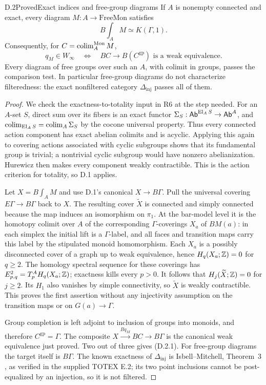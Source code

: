 \begin{claim}{D.2}{Proved}{Exact indices and free-group diagrams}
\label{D:exact}
If $A$ is nonempty connected and exact, every diagram
$M:A\to\mathrm{FreeMon}$ satisfies
\[
 B\int_A M\simeq K(\Gamma,1).
\]
Consequently, for $C=\operatorname*{colim}_A^{\mathrm{Mon}}M$,
\[
 q_M\in W_\infty
 \quad\Longleftrightarrow\quad
 BC\longrightarrow B(C^{\mathrm{gp}})\text{ is a weak equivalence}.
 \tag{D.2.1}
\]
Every diagram of free groups over such an $A$, with colimit in
groups, passes the comparison test. In particular free-group
diagrams do not characterize filteredness: the exact nonfiltered
category $\Delta_{\mathrm{inj}}$ passes all of them.
\end{claim}
\begin{proof}
We check the exactness-to-totality input in R6 at the step needed.
For an $A$-set $S$, direct sum over its fibers is an exact functor
$\Sigma_S:\mathsf{Ab}^{\operatorname{El}_A S}\to\mathsf{Ab}^A$, and
$\operatorname*{colim}_{\operatorname{El}_A S}=\operatorname*{colim}_A\Sigma_S$ by the cocone universal
property. Thus every connected action component has exact abelian
colimits and is acyclic. Applying this again to covering actions
associated with cyclic subgroups shows that its fundamental group
is trivial; a nontrivial cyclic subgroup would have nonzero
abelianization. Hurewicz then makes every component weakly
contractible. This is the action criterion for totality, so D.1
applies.

Let $X=B\int_A M$ and use D.1's canonical $X\to B\Gamma$.
Pull the universal covering $E\Gamma\to B\Gamma$ back to $X$.
The resulting cover $\widetilde X$ is connected and simply
connected because the map induces an isomorphism on $\pi_1$.
At the bar-model level it is the homotopy colimit over $A$ of
the corresponding $\Gamma$-coverings $X_a$ of $BM(a)$:
in each simplex the initial lift is a $\Gamma$-label, and all
faces and transition maps carry this label by the stipulated
monoid homomorphism. Each $X_a$ is a possibly disconnected
cover of a graph up to weak equivalence, hence
$H_q(X_a;\mathbb Z)=0$ for $q\geq2$.
The homology spectral sequence for these coverings has
$E^2_{p,q}=T_p^A H_q(X_a;\mathbb Z)$; exactness kills every $p>0$.
It follows that $H_j(\widetilde X;\mathbb Z)=0$ for $j\geq2$.
Its $H_1$ also vanishes by simple connectivity, so
$\widetilde X$ is weakly contractible. This proves the first
assertion without any injectivity assumption on the transition
maps or on $G(a)\to\Gamma$.

Group completion is left adjoint to inclusion of groups into
monoids, and therefore $C^{\mathrm{gp}}=\Gamma$.
The composite $X\xrightarrow{Bq_M}BC\to B\Gamma$ is the
canonical weak equivalence just proved. Two out of three gives
(D.2.1). For free-group diagrams the target itself is $B\Gamma$.
The known exactness of $\Delta_{\mathrm{inj}}$ is
Isbell--Mitchell, Theorem~3 \cite{IsbellMitchell1973}, as verified
in the supplied TOTEX E.2; its two point inclusions cannot be
post-equalized by an injection, so it is not filtered.
\end{proof}

